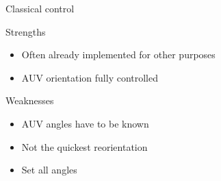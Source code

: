 \documentclass[10pt, xcolor={usenames, dvipsnames}]{beamer}
\begin{document}
        \begin{frame}{Classical control}
            \centering
            \begin{minipage}{0.75\textwidth}
                \begin{block}{Strengths}
                    \vspace{0.2cm}
                    \begin{itemize}
                        \item Often already implemented for other purposes
                        \item AUV orientation fully controlled
                    \end{itemize}
                \end{block}
                \begin{block}{Weaknesses}
                    \begin{itemize}
                        \item AUV angles have to be known
                        \item Not the quickest reorientation
                        \item Set all angles
                    \end{itemize}
                \end{block}
            \end{minipage}
        \end{frame}
\end{document}
